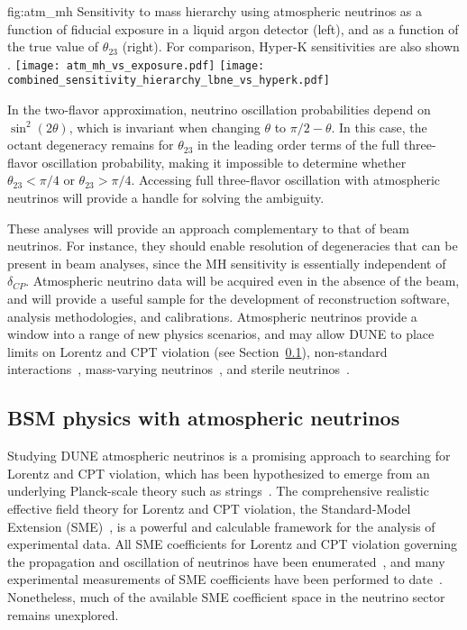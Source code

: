 \begin{dunefigure}
{fig:atm_mh}
{Sensitivity to mass hierarchy using atmospheric neutrinos as a function of fiducial exposure in a liquid argon detector (left), and as a function of the true value of $\theta_{23}$ (right).  For comparison, Hyper-K sensitivities are also shown \cite{Kearns:2013lea}.}
\texttt{[image: atm\_mh\_vs\_exposure.pdf]}
\texttt{[image: combined\_sensitivity\_hierarchy\_lbne\_vs\_hyperk.pdf]}
\end{dunefigure}

In the two-flavor approximation, neutrino oscillation probabilities depend on 
$\sin^2(2\theta)$, which is invariant when changing $\theta$ to $\pi/2-\theta$. In this case, the octant 
degeneracy remains for $\theta_{23}$ in the leading order terms of the full 
three-flavor oscillation probability, making it impossible to determine whether $\theta_{23}< \pi/4$ or 
$\theta_{23}> \pi/4$. Accessing full three-flavor oscillation with atmospheric neutrinos 
will provide a handle for solving the ambiguity.


These analyses will provide an approach complementary to that of beam neutrinos. 
For instance, they should enable resolution of 
degeneracies that can be present in beam analyses, since %
the MH sensitivity is essentially independent of $\delta_{CP}$.   Atmospheric neutrino data will be acquired 
even in the absence of the beam, and will provide a useful sample for the development of 
reconstruction software, analysis methodologies, and calibrations.  
Atmospheric neutrinos provide a window into a range of new physics scenarios, and %
may allow DUNE to place limits on Lorentz and CPT violation (see Section~\ref{sec:nonaccel-atm-bsm}), 
non-standard interactions~\cite{Chatterjee:2014gxa}, mass-varying neutrinos~\cite{Abe:2008zza}, and
sterile neutrinos~\cite{Abe:2014gda}.

\subsection{BSM physics with atmospheric neutrinos}
\label{sec:nonaccel-atm-bsm}

Studying DUNE atmospheric neutrinos is a promising approach
to searching for Lorentz and CPT violation,
which has been hypothesized
to emerge from an underlying Planck-scale theory such as strings~\cite{Kostelecky:1988zi,Kostelecky:1991ak}.
The comprehensive realistic effective field theory
for Lorentz and CPT violation,
the Standard-Model Extension (SME)~\cite{Kostelecky:1994rn,Colladay:1996iz,Colladay:1998fq,Kostelecky:2003fs},
is a powerful and calculable framework
for the analysis of experimental data.
All SME coefficients for Lorentz and CPT violation
governing the propagation and oscillation of neutrinos
have been enumerated~\cite{Kostelecky:2003cr,Kostelecky:2011gq},
and many experimental measurements of SME coefficients 
have been performed to date~\cite{Kostelecky:2008ts}.
Nonetheless,
much of the available SME coefficient space 
in the neutrino sector remains unexplored.

